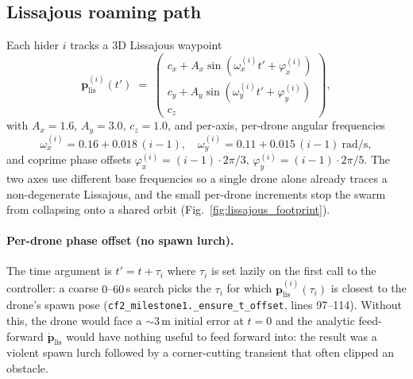 \documentclass[11pt,a4paper]{article}
\newcommand{\code}[1]{\texttt{#1}}
\newcommand{\vect}[1]{\mathbf{#1}}
\begin{document}
\subsection{Lissajous roaming path}
\label{sec:lissajous}

Each hider $i$ tracks a 3D Lissajous waypoint
\[
    \vect{p}_\mathrm{lis}^{(i)}(t')
    \;=\;
    \begin{pmatrix}
        c_x + A_x \sin(\omega_x^{(i)} t' + \varphi_x^{(i)}) \\
        c_y + A_y \sin(\omega_y^{(i)} t' + \varphi_y^{(i)}) \\
        c_z
    \end{pmatrix},
\]
with $A_x = 1.6$, $A_y = 3.0$, $c_z = 1.0$, and per-axis, per-drone angular
frequencies
\[
\omega_x^{(i)} = 0.16 + 0.018\,(i-1),\quad
\omega_y^{(i)} = 0.11 + 0.015\,(i-1)\ \text{rad/s},
\]
and coprime phase offsets
$\varphi^{(i)}_x = (i-1)\cdot 2\pi/3$,
$\varphi^{(i)}_y = (i-1)\cdot 2\pi/5$.
The two axes use different base frequencies so a single drone alone already
traces a non-degenerate Lissajous, and the small per-drone increments stop
the swarm from collapsing onto a shared orbit
(Fig.~\ref{fig:lissajous_footprint}).

\paragraph{Per-drone phase offset (no spawn lurch).}
The time argument is $t' = t + \tau_i$ where $\tau_i$ is set lazily on the
first call to the controller: a coarse $0$--$60$\,s search picks the
$\tau_i$ for which $\vect{p}_\mathrm{lis}^{(i)}(\tau_i)$ is closest to the
drone's spawn pose
(\code{cf2\_milestone1.\_ensure\_t\_offset}, lines 97--114). Without
this, the drone would face a $\sim 3$\,m initial error at $t = 0$ and the
analytic feed-forward $\dot{\vect{p}}_\mathrm{lis}$ would have nothing
useful to feed forward into: the result was a violent spawn lurch followed
by a corner-cutting transient that often clipped an obstacle.
\end{document}
